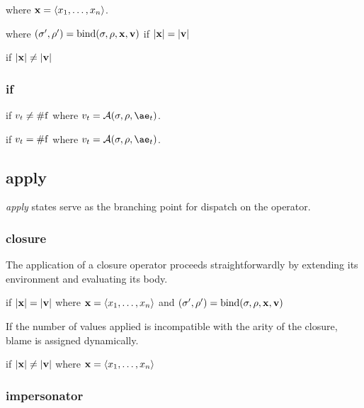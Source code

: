 \noindent
{}

\noindent
where $\mathbf{x}=\langle x_1,\dots,x_n\rangle$.


\noindent
where $(\sigma',\rho')=\mathrm{bind}(\sigma,\rho,\mathbf{x},\mathbf{v})$ if $|\mathbf{x}|=|\mathbf{v}|$

 if $|\mathbf{x}|\ne|\mathbf{v}|$

\subsubsection{if}

if $v_t\ne\mathrm{\#f}$
where $v_t=\A{\sigma}{\rho}{\ae_t}$.

if $v_t=\mathrm{\#f}$
where $v_t=\A{\sigma}{\rho}{\ae_t}$.

\subsection{apply}

\emph{apply} states serve as the branching point for dispatch on the operator.

\subsubsection{closure}

The application of a closure operator proceeds straightforwardly by extending its environment and evaluating its body.

if $|\mathbf{x}|=|\mathbf{v}|$ where $\mathbf{x}=\langle x_1,\dots,x_n\rangle$ and $(\sigma',\rho')=\mathrm{bind}(\sigma,\rho,\mathbf{x},\mathbf{v})$

If the number of values applied is incompatible with the arity of the closure, blame is assigned dynamically.

if $|\mathbf{x}|\ne|\mathbf{v}|$ where $\mathbf{x}=\langle x_1,\dots,x_n\rangle$

\subsubsection{impersonator}

